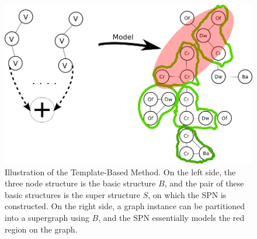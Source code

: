 \documentclass[10pt, titlepage]{article}
\theoremstyle{definition}
\begin{document}
\begin{figure}[!htb]
    \centering
    \captionsetup{width=.8\linewidth}
    \includegraphics[scale=0.4]{images/big_graph.png}
    \caption{Illustration of the Template-Based Method. On the left side, the three node structure is the basic structure $B$, and the pair of these basic structures is the super structure $S$, on which the SPN is constructed. On the right side, a graph instance can be partitioned into a supergraph using $B$, and the SPN essentially models the red region on the graph.}
    \label{fig:tmpmod}
\end{figure}
\end{document}
